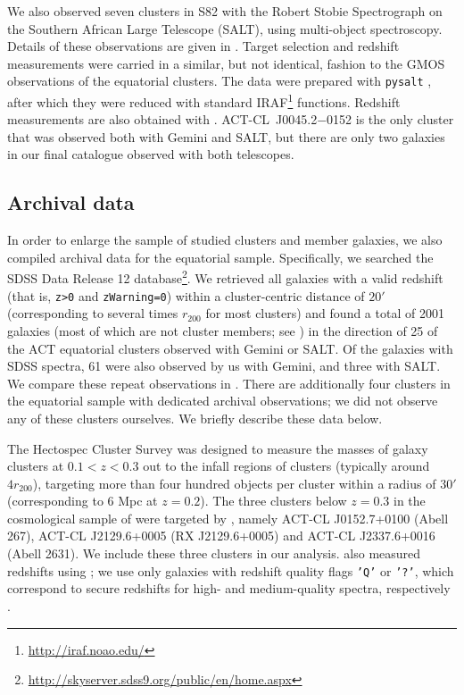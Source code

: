 We also observed seven clusters in S82 with the Robert Stobie Spectrograph \citep[RSS,][]{burgh03} 
on the Southern African Large Telescope (SALT), using multi-object spectroscopy. Details of these 
observations are given in \cite{kirk15}. Target selection and redshift measurements were carried 
in a similar, but not identical, fashion to the GMOS observations of the equatorial clusters. The 
data were prepared with \texttt{pysalt} \citep{crawford10}, after which they were reduced with 
standard IRAF\footnote{\url{http://iraf.noao.edu/}} functions. Redshift measurements are also 
obtained with \xcsao. ACT-CL~J0045.2$-$0152 is the only cluster that was observed both with Gemini 
and SALT, but there are only two galaxies in our final catalogue observed with both telescopes.

\subsection{Archival data}\label{s:archival}

In order to enlarge the sample of studied clusters and member galaxies, we also compiled archival data for the equatorial sample. Specifically, we searched the SDSS Data Release 12 \citep[DR12,][]{sdss12} database\footnote{\url{http://skyserver.sdss9.org/public/en/home.aspx}}. We retrieved all galaxies with a valid redshift (that is, \texttt{z>0} and \texttt{zWarning=0}) within a cluster-centric distance of $20'$ (corresponding to several times $r_{200}$ for most clusters) and found a total of 2001 galaxies (most of which are not cluster members; see ) in the direction of 25 of the ACT equatorial clusters observed with Gemini or SALT. Of the galaxies with SDSS spectra, 61 were also observed by us with Gemini, and three with SALT. We compare these repeat observations in . There are additionally four clusters in the equatorial sample with dedicated archival observations; we did not observe any of these clusters ourselves. We briefly describe these data below.

The Hectospec Cluster Survey \citep[HeCS,][]{rines13} was designed to measure the masses of galaxy 
clusters at $0.1<z<0.3$ out to the infall regions of clusters (typically around $4r_{200}$), 
targeting more than four hundred objects per cluster within a radius of $30'$ (corresponding 
to 6 Mpc at $z=0.2$). The three clusters below $z=0.3$ in the cosmological sample of 
\cite{hasselfield13} were targeted by \cite{rines13}, namely ACT-CL J0152.7+0100 (Abell 267), 
ACT-CL J2129.6+0005 (RX J2129.6+0005) and ACT-CL J2337.6+0016 (Abell 2631). We include these three 
clusters in our analysis. \cite{rines13} also measured redshifts using \xcsao; we use only 
galaxies with redshift quality flags \texttt{'Q'} or \texttt{'?'}, which correspond to secure 
redshifts for high- and medium-quality spectra, respectively \citep{rines13}.

